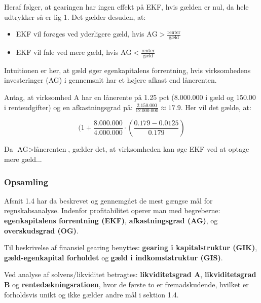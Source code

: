 \documentclass[10pt,reqno, usenames]{article}
\begin{document}
Heraf følger, at gearingen har ingen effekt på EKF, hvis gælden er nul, da hele udtrykker så er lig 1. Det gælder desuden, at:

\begin{itemize}
    \item EKF vil forøges ved yderligere gæld, hvis $\text{AG} > \frac{\text{renter}}{\text{gæld}}$
    \item EKF vil fale ved mere gæld, hvis $\text{AG} < \frac{\text{renter}}{\text{gæld}}$
\end{itemize}

Intuitionen er her, at gæld øger egenkapitalens forrentning, hvis virksomhedens investeringer (AG) i gennemsnit har et højere afkast end lånerenten. 


\begin{tcolorbox}[colback=red!5!white, colframe=red!50!black, title= Eksempel af EKF dekomponering, breakable]
Antag, at virksomhed A har en lånerente på 1.25 pct (8.000.000 i gæld og 150.00 i renteudgifter) og en afkastningsgrad på: $\frac{2.150.000}{12.000.000} \approx 17.9$. Her vil det gælde, at: 

\begin{equation}
    (1 + \frac{8.000.000}{4.000.000} \cdot (\frac{0.179 - 0.0125}{0.179})
\end{equation}

Da $\text{AG} > \text{lånerenten}$, gælder det, at virksomheden kan øge EKF ved at optage mere gæld... 
\end{tcolorbox}

\subsubsection{Opsamling}
Afsnit 1.4 har da beskrevet og gennemgået de mest gængse mål for regnskabsanalyse. Indenfor profitabilitet operer man med begreberne: \textbf{egenkapitalens forrentning (EKF)}, \textbf{afkastningsgrad (AG)}, og \textbf{overskudsgrad (OG)}. 

\vspace{10 pt}

Til beskrivelse af finansiel gearing benyttes: \textbf{gearing i kapitalstruktur (GIK)}, \textbf{gæld-egenkapital forholdet} og \textbf{gæld i indkomststruktur (GIS)}. 

\vspace{10 pt}

Ved analyse af solvens/likviditet betragtes: \textbf{likviditetsgrad A}, \textbf{likviditetsgrad B} og \textbf{rentedækningsratioen}, hvor de første to er fremadskudende, hvilket er forholdsvis unikt og ikke gælder andre mål i sektion 1.4. 
\end{document}
